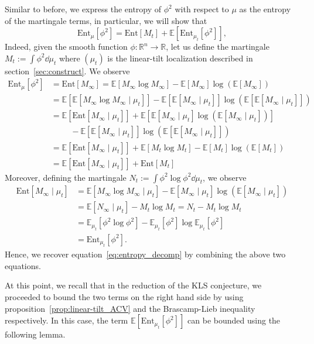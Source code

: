 Similar to before, we express the entropy of \(\phi^2\) with respect to \(\mu\) as 
the entropy of the martingale terms, in particular, we will show that
\begin{equation}\label{eq:entropy_decomp}
  \text{Ent}_\mu[\phi^2] = \text{Ent}[M_t] + \mathbb{E}[\text{Ent}_{\mu_t}[\phi^2]],
\end{equation}
Indeed, given the smooth function \(\phi : \mathbb{R}^n \to \mathbb{R}\), let us define the martingale 
\(M_t := \int \phi^2 \dd \mu_t\) where \((\mu_t)\) is the linear-tilt localization described in section~\ref{sec:construct}. 
We observe
\begin{align*}
  \text{Ent}_\mu[\phi^2] & = \text{Ent}[M_\infty] 
    = \mathbb{E}[M_\infty \log M_\infty] - \mathbb{E}[M_\infty]\log(\mathbb{E}[M_\infty]) \\
  & = \mathbb{E}[\mathbb{E}[M_\infty \log M_\infty \mid \mu_t]] 
      - \mathbb{E}[\mathbb{E}[M_\infty \mid \mu_t]]\log(\mathbb{E}[\mathbb{E}[M_\infty \mid \mu_t]]) \\
  & = \mathbb{E}[\text{Ent}[M_\infty \mid \mu_t]] + \mathbb{E}[\mathbb{E}[M_\infty \mid \mu_t]\log(\mathbb{E}[M_\infty \mid \mu_t])]\\ 
  & \hspace{1cm} - \mathbb{E}[\mathbb{E}[M_\infty \mid \mu_t]]\log(\mathbb{E}[\mathbb{E}[M_\infty \mid \mu_t]])\\
  & = \mathbb{E}[\text{Ent}[M_\infty \mid \mu_t]] + \mathbb{E}[M_t \log M_t] - \mathbb{E}[M_t]\log(\mathbb{E}[M_t])\\
  & = \mathbb{E}[\text{Ent}[M_\infty \mid \mu_t]] + \text{Ent}[M_t]
\end{align*}
Moreover, defining the martingale \(N_t := \int \phi^2\log \phi^2 \dd \mu_t\), we observe
\begin{align*}
  \text{Ent}[M_\infty \mid \mu_t] 
  & = \mathbb{E}[M_\infty \log M_\infty \mid \mu_t] - \mathbb{E}[M_\infty \mid \mu_t]\log(\mathbb{E}[M_\infty \mid \mu_t]) \\
  & = \mathbb{E}[N_\infty \mid \mu_t] - M_t \log M_t = N_t - M_t \log M_t\\
  & = \mathbb{E}_{\mu_t}[\phi^2 \log \phi^2] - \mathbb{E}_{\mu_t}[\phi^2] \log \mathbb{E}_{\mu_t}[\phi^2] \\
  & = \text{Ent}_{\mu_t}[\phi^2].
\end{align*}
Hence, we recover equation~\eqref{eq:entropy_decomp} by combining the above two equations.

At this point, we recall that in the reduction of the KLS conjecture, we proceeded to bound the two terms on the 
right hand side by using proposition~\ref{prop:linear-tilt_ACV} and the Brascamp-Lieb inequality respectively. 
In this case, the term \(\mathbb{E}[\text{Ent}_{\mu_t}[\phi^2]]\) can be bounded using the following lemma.

